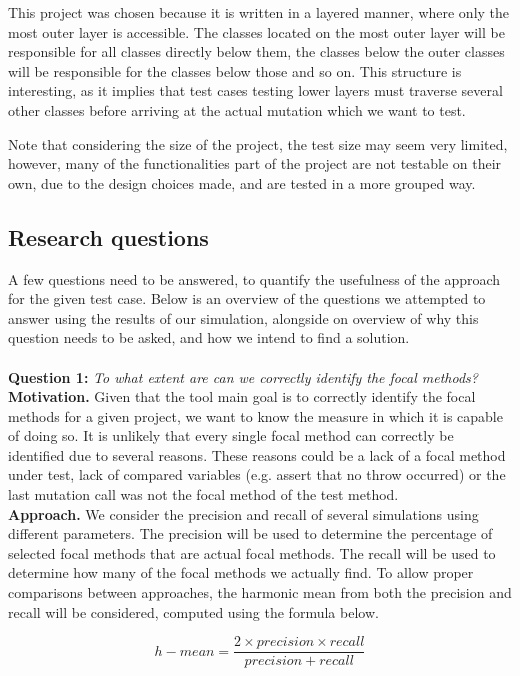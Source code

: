 \documentclass[11pt]{article}
\begin{document}
\begin{multicols}{2}
This project was chosen because it is written in a layered manner, where only the most outer layer is accessible. The classes located on the most outer layer will be responsible for all classes directly below them, the classes below the outer classes will be responsible for the classes below those and so on. This structure is interesting, as it implies that test cases testing lower layers must traverse several other classes before arriving at the actual mutation which we want to test.

Note that considering the size of the project, the test size may seem very limited, however, many of the functionalities part of the project are not testable on their own, due to the design choices made, and are tested in a more grouped way. 

\subsection{Research questions}
A few questions need to be answered, to quantify the usefulness of the approach for the given test case. Below is an overview of the questions we attempted to answer using the results of our simulation, alongside on overview of why this question needs to be asked, and how we intend to find a solution.\\
\\
\noindent
\textbf{Question 1:} \textit{To what extent are can we correctly identify the focal methods?}\\
\textbf{Motivation.} Given that the tool main goal is to correctly identify the focal methods for a given project, we want to know the measure in which it is capable of doing so. It is unlikely that every single focal method can correctly be identified due to several reasons. These reasons could be a lack of a focal method under test, lack of compared variables (e.g. assert that no throw occurred) or the last mutation call was not the focal method of the test method.\\
\textbf{Approach.} We consider the precision and recall of several simulations using different parameters. The precision will be used to determine the percentage of selected focal methods that are actual focal methods. The recall will be used to determine how many of the focal methods we actually find. To allow proper comparisons between approaches, the harmonic mean from both the precision and recall will be considered, computed using the formula below.

\[h-mean = \frac{2 \times precision \times recall}{precision + recall}\]


\end{multicols}
\end{document}
